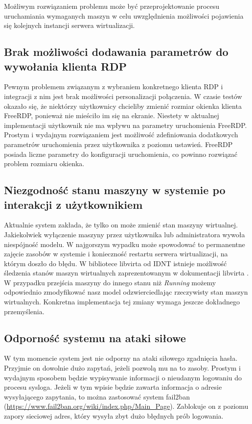 \documentclass[../podsumowanie.tex]{subfiles}
\begin{document}
Możliwym rozwiązaniem problemu może być przeprojektowanie procesu uruchamiania wymaganych maszyn w celu uwzględnienia możliwości pojawienia się kolejnych instancji serwera wirtualizacji.

\subsection{Brak możliwości dodawania parametrów do wywołania klienta RDP}

Pewnym problemem związanym z wybraniem konkretnego klienta RDP i integracji z nim jest brak możliwości personalizacji połączenia.
W czasie testów okazało się, że niektórzy użytkownicy chcieliby zmienić rozmiar okienka klienta FreeRDP, ponieważ nie mieściło im się na ekranie.
Niestety w aktualnej implementacji użytkownik nie ma wpływu na parametry uruchomienia FreeRDP.
Prostym i wydajnym rozwiązaniem jest możliwość zdefiniowania dodatkowych parametrów uruchomienia przez użytkownika z poziomu ustawień.
FreeRDP posiada liczne parametry do konfiguracji \parencite{freerdp-manual} uruchomienia, co powinno rozwiązać problem rozmiaru okienka.

\subsection{Niezgodność stanu maszyny w systemie po interakcji z użytkownikiem}

Aktualnie system zakłada, że tylko on może zmienić stan maszyny wirtualnej.
Jakiekolwiek wyłączenie maszyny przez użytkownika lub administratora wywoła niespójność modelu.
W najgorszym wypadku może spowodować to permanentne zajęcie zasobów w systemie i konieczność restartu serwera wirtualizacji, na którym doszło do błędu.
W bibliotece libvirta od IDNT istnieje możliwość śledzenia stanów maszyn wirtualnych zaprezentowanym w dokumentacji libvirta \parencite{libvirt-vm-states}.
W przypadku przejścia maszyny do innego stanu niż \textit{Running} możemy odpowiednio zmodyfikować nasz model odzwierciedlając rzeczywisty stan maszyn wirtualnych.
Konkretna implementacja tej zmiany wymaga jeszcze dokładnego przemyślenia.

\subsection{Odporność systemu na ataki siłowe}

W tym momencie system jest nie odporny na ataki siłowego zgadnięcia hasła.
Przyjmie on dowolnie dużo zapytań, jeżeli pozwolą mu na to zasoby.
Prostym i wydajnym sposobem będzie wypisywanie informacji o nieudanym logowaniu do procesu sysloga.
Jeżeli w tym wpisie będzie zawarta informacja o adresie wysyłającego zapytania, to można zastosować system fail2ban (\url{https://www.fail2ban.org/wiki/index.php/Main_Page}).
Zablokuje on z poziomu zapory sieciowej adres, który wysyła zbyt dużo błędnych prób logowania.
\end{document}
